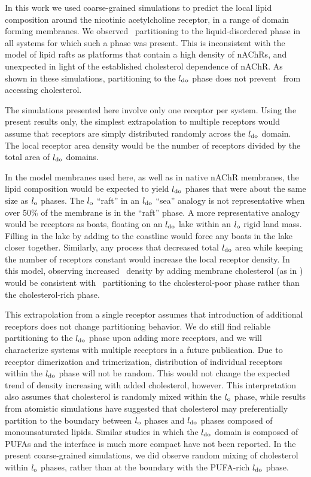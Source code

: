In this work we used coarse-grained simulations to predict the local lipid composition around the nicotinic acetylcholine receptor, in a range of domain forming membranes.  We observed  \nachr~partitioning to the liquid-disordered phase in all systems for which such a phase was present.  This is inconsistent with the model of lipid rafts as platforms that contain a high density of nAChRs, and unexpected in light of the established cholesterol dependence of nAChR.  As shown in these simulations, partitioning to the $l_{\mathrm{do}}$ phase does not prevent \nachr~from accessing cholesterol. 

The simulations presented here involve only one receptor per system.  Using the present results only, the simplest extrapolation to multiple receptors would assume that receptors are simply distributed randomly across the $l_{\mathrm{do}}$ domain.  The local receptor area density would be the number of receptors divided by the total area of $l_{\mathrm{do}}$ domains.    

In the model membranes used here, as well as in native nAChR membranes, the lipid composition would be expected to yield $l_{\mathrm{do}}$ phases that were about the same size as $l_{\mathrm{o}}$ phases. The $l_{\mathrm{o}}$ ``raft'' in an $l_{\mathrm{do}}$ ``sea'' analogy is not representative when over 50\% of the membrane is in the ``raft'' phase.  A more representative analogy would be receptors as boats, floating on an $l_{\mathrm{do}}$ lake within an $l_{\mathrm{o}}$ rigid land mass.  Filling in the lake by adding to the coastline would force any boats in the lake closer together.  Similarly, any process that decreased total $l_{\mathrm{do}}$ area while keeping the number of receptors constant would increase the local receptor density.   In this model, observing increased \nachr~density by adding membrane cholesterol (as in \citep{Barrantes2000,
Barrantes2014,Bruses2001,Marchand2002,Oshikawa2003,Pato2008,Zhu2006a, Barrantes2007,Wenz2005,Borroni2016}) would be consistent with \nachr~partitioning to the cholesterol-poor phase rather than the cholesterol-rich phase. 

This extrapolation from a single receptor assumes that introduction of additional receptors does not change partitioning behavior.  We do still find reliable partitioning to the $l_{\mathrm{do}}$ phase upon adding more receptors, and we will characterize systems with multiple receptors in a future publication. Due to receptor dimerization and trimerization, distribution of individual receptors within the $l_{\mathrm{do}}$ phase will not be random.   This would not change the expected trend of density increasing with added cholesterol, however.  This interpretation also assumes that cholesterol is randomly mixed within the $l_{\mathrm{o}}$ phase, while results from atomistic simulations\citep{Sodt2014, Iyer2018} have suggested that cholesterol may preferentially partition to the boundary between $l_{\mathrm{o}}$ phases and $l_{\mathrm{do}}$ phases composed of monounsaturated lipids. Similar studies in which the $l_{\mathrm{do}}$ domain is composed of PUFAs and the interface is much more compact have not been reported.  In the present coarse-grained simulations, we did observe random mixing of cholesterol within $l_{\mathrm{o}}$ phases, rather than at the boundary with the PUFA-rich $l_{\mathrm{do}}$ phase.  

